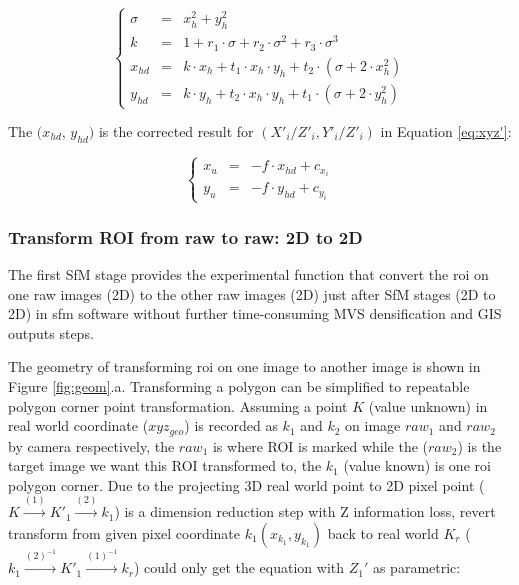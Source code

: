 \documentclass{configs/bmcart}
\begin{document}
$$
  \left\{\begin{array}{lll}
    \sigma & = & x_h^2 + y_h^2 \\
    k      & = & 1 + r_1 \cdot \sigma + r_2 \cdot \sigma^2 + r_3 \cdot \sigma^3 \\
    x_{hd} & = & k \cdot x_h + t_1 \cdot x_h \cdot y_h + t_2 \cdot (\sigma + 2 \cdot x_h^2) \\
    y_{hd} & = & k \cdot y_h + t_2 \cdot x_h \cdot y_h + t_1 \cdot (\sigma + 2 \cdot y_h^2)
  \end{array} \right. \nonumber
$$

The $(x_{hd}$, $y_{hd})$ is the corrected result for $(X'_i / Z'_i, Y'_i / Z'_i)$ in Equation \ref{eq:xyz'}:

$$
\left\{
  \begin{array}{lll}
    x_u & = & - f \cdot x_{hd} + c_{x_i} \\
    y_u & = & - f \cdot y_{hd} + c_{y_i}
  \end{array} 
\right.
$$

\subsubsection*{Transform ROI from raw to raw: 2D to 2D}
The first SfM stage provides the experimental function that convert the \acrfull*{roi} on one raw images (2D) to the other raw images (2D) just after SfM stages (2D to 2D) in \acrlong*{sfm} software without further time-consuming MVS densification and GIS outputs steps.

The geometry of transforming \acrfull*{roi} on one image to another image is shown in Figure \ref{fig:geom}.a. Transforming a polygon can be simplified to repeatable polygon corner point transformation. Assuming a point $K$ (value unknown) in real world coordinate ($xyz_{geo}$) is recorded as $k_1$ and $k_2$ on image $raw_1$ and $raw_2$ by camera respectively, the $raw_1$ is where ROI is marked while the ($raw_2$) is the target image we want this ROI transformed to, the $k_1$ (value known) is one \acrshort*{roi} polygon corner. Due to the projecting 3D real world point to 2D pixel point ($K \xrightarrow{(1)} K'_1 \xrightarrow{(2)} k_1$) is a dimension reduction step with Z information loss, revert transform from given pixel coordinate $k_1 (x_{k_1}, y_{k_1})$ back to real world $K_r$ ($k_1 \xrightarrow{(2)^{-1}} K'_1 \xrightarrow{(1)^{-1}} k_r$) could only get the equation with $Z_1'$ as parametric:
\end{document}
